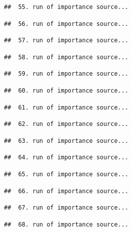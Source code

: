\documentclass[
]{article}
\begin{document}
\begin{verbatim}
##  55. run of importance source...
\end{verbatim}

\begin{verbatim}
##  56. run of importance source...
\end{verbatim}

\begin{verbatim}
##  57. run of importance source...
\end{verbatim}

\begin{verbatim}
##  58. run of importance source...
\end{verbatim}

\begin{verbatim}
##  59. run of importance source...
\end{verbatim}

\begin{verbatim}
##  60. run of importance source...
\end{verbatim}

\begin{verbatim}
##  61. run of importance source...
\end{verbatim}

\begin{verbatim}
##  62. run of importance source...
\end{verbatim}

\begin{verbatim}
##  63. run of importance source...
\end{verbatim}

\begin{verbatim}
##  64. run of importance source...
\end{verbatim}

\begin{verbatim}
##  65. run of importance source...
\end{verbatim}

\begin{verbatim}
##  66. run of importance source...
\end{verbatim}

\begin{verbatim}
##  67. run of importance source...
\end{verbatim}

\begin{verbatim}
##  68. run of importance source...
\end{verbatim}
\end{document}
